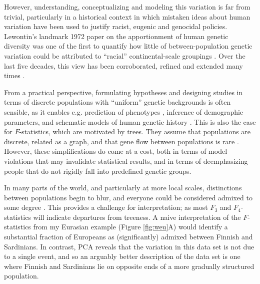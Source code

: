 \documentclass[12pt,fullpage, a4paper]{article}
\begin{document}
However, understanding, conceptualizing and modeling this variation is far from trivial, particularly in a historical context in which mistaken ideas about human variation have been used to justify racist, eugenic and genocidal policies. Lewontin’s landmark 1972 paper on the apportionment of human genetic diversity was one of the first to quantify how little of between-population genetic variation could be attributed to ``racial'' continental-scale groupings \citep{novembre2022}. Over the last five decades, this view has been corroborated, refined and extended many times \citep{cann1987, cavalli-sforza1994, barbujani1997, rosenberg2002a}. 

From a practical perspective, formulating hypotheses and designing studies in terms of discrete populations with ``uniform'' genetic backgrounds is often sensible, as it enables  e.g. prediction of phenotypes \citep{berg2019, yair2021}, inference of demographic parameters, and schematic models of human genetic history \citep{patterson2012}. This is also the case for $F$-statistics, which are motivated by trees. They assume that populations are discrete, related as a graph, and that gene flow between populations is rare \citep{patterson2012,harney2021}.
However, these simplifications do come at a cost, both in terms of model violations that may invalidate statistical results, and in terms of deemphasizing people that do not rigidly fall into predefined genetic groups.


In many parts of the world, and particularly at more local scales, distinctions between populations begin to blur, and everyone could be considered  admixed to some degree \citep{pickrell2014}. This provides a challenge for interpretation; as most $F_3$ and $F_4$-statistics will indicate departures from treeness. A naive interpretation of the $F$-statistics from my Eurasian example  (Figure \ref{fig:weu}A) would identify a substantial fraction of Europeans as (significantly) admixed between Finnish and Sardinians. In contrast, PCA reveals that the variation in this data set is not due to a single event, and so an arguably better description of the data set is one where Finnish and Sardinians lie on opposite ends of a more gradually structured population.
\end{document}
